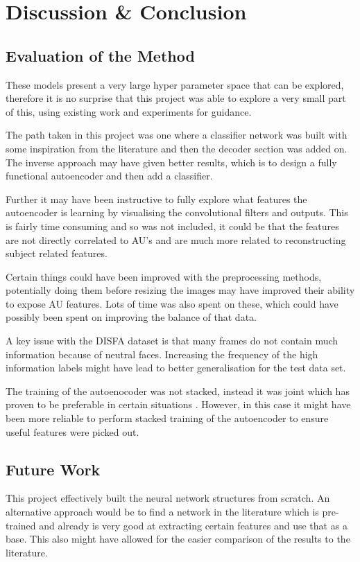 \chapter{Discussion \& Conclusion}

  \section{Evaluation of the Method}
    These models present a very large hyper parameter space that can be explored, therefore
    it is no surprise that this project was able to explore a very small part of this, using
    existing work and experiments for guidance.

    The path taken in this project was one where a classifier network was built
    with some inspiration from the literature and then the decoder section was added on.
    The inverse approach may have given better results, which is to design a fully functional
    autoencoder and then add a classifier.

    Further it may have been instructive to fully explore what features the autoencoder is learning
    by visualising the convolutional filters and outputs. This is fairly time consuming and
    so was not included, it could be that the features are not directly correlated to AU's and
    are much more related to reconstructing subject related features.

    Certain things could have been improved with the preprocessing methods,
    potentially doing them before resizing the images may have improved their
    ability to expose AU features. Lots of time was also spent on these, which could have
    possibly been spent on improving the balance of that data.

    A key issue with the DISFA dataset is that many frames do not contain much information
    because of neutral faces. Increasing the frequency of the high information labels
    might have lead to better generalisation for the test data set.

    The training of the autoenocoder was not stacked, instead it was joint which has
    proven to be preferable in certain situations \cite{Zhou2014}. However, in this case
    it might have been more reliable to perform stacked training of the autoencoder to ensure
    useful features were picked out.

  \section{Future Work}
    This project effectively built the neural network structures from scratch.
    An alternative approach would be to find a network in the literature which is pre-trained
    and already is very good at extracting certain features and use that as a base.
    This also might have allowed for the easier comparison of the results to the literature.

